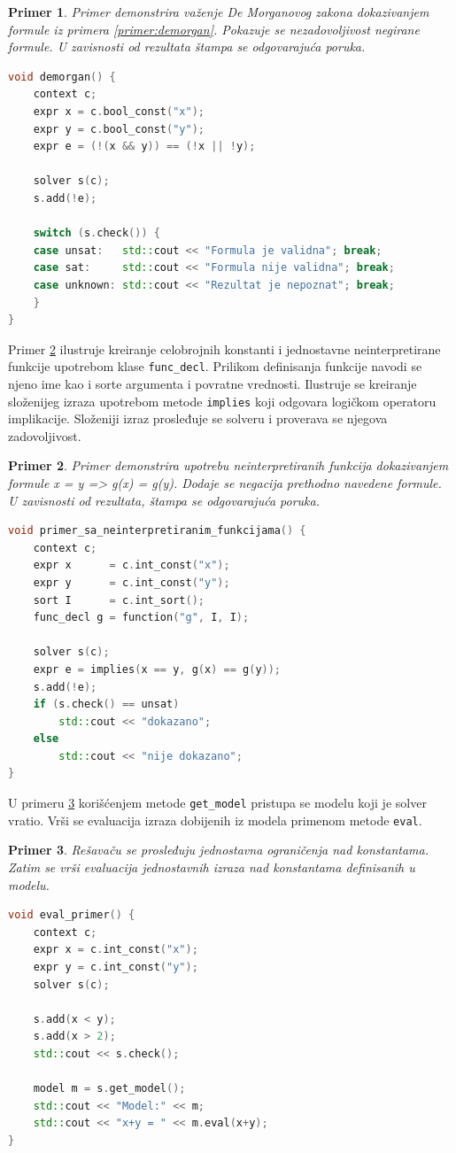 \documentclass[12pt,oneside]{memoir}
\newtheorem{primer}{Primer}
\begin{document}
\begin{primer} \label{ex1} Primer demonstrira važenje De Morganovog zakona dokazivanjem formule iz primera \ref{primer:demorgan}. Pokazuje se nezadovoljivost negirane formule. U zavisnosti od rezultata štampa se odgovarajuća poruka.
\begin{lstlisting}[language=C++]
void demorgan() {
    context c;
    expr x = c.bool_const("x");
    expr y = c.bool_const("y");
    expr e = (!(x && y)) == (!x || !y);
    
    solver s(c);
    s.add(!e);

    switch (s.check()) {
    case unsat:   std::cout << "Formula je validna"; break;
    case sat:     std::cout << "Formula nije validna"; break;
    case unknown: std::cout << "Rezultat je nepoznat"; break;
    }
}
\end{lstlisting}
\end{primer}

Primer \ref{ex2} ilustruje kreiranje celobrojnih konstanti i jednostavne neinterpretirane funkcije upotrebom klase \texttt{func\_decl}. Prilikom definisanja funkcije navodi se njeno ime kao i sorte argumenta i povratne vrednosti. Ilustruje se kreiranje složenijeg izraza upotrebom metode \texttt{implies} koji odgovara logičkom operatoru implikacije. Složeniji izraz prosleđuje se solveru i proverava se njegova zadovoljivost.
\begin{primer} \label{ex2} Primer demonstrira upotrebu neinterpretiranih funkcija dokazivanjem formule x = y => g(x) = g(y). Dodaje se negacija prethodno navedene formule. U zavisnosti od rezultata, štampa se odgovarajuća poruka.\\
\begin{lstlisting}[language=C++]
void primer_sa_neinterpretiranim_funkcijama() { 
    context c;
    expr x      = c.int_const("x");
    expr y      = c.int_const("y");
    sort I      = c.int_sort();
    func_decl g = function("g", I, I);
    
    solver s(c);
    expr e = implies(x == y, g(x) == g(y));
    s.add(!e);
    if (s.check() == unsat) 
        std::cout << "dokazano";
    else
        std::cout << "nije dokazano";
}
\end{lstlisting}
\end{primer}


U primeru \ref{ex3} korišćenjem metode \texttt{get\_model} pristupa se modelu koji je solver vratio. Vrši se evaluacija izraza dobijenih iz modela primenom metode \texttt{eval}.  
\begin{primer} \label{ex3} Rešavaču se prosleđuju jednostavna ograničenja nad konstantama. Zatim se vrši evaluacija jednostavnih izraza nad konstantama definisanih u modelu.
\begin{lstlisting}[language=C++]
void eval_primer() {
    context c;
    expr x = c.int_const("x");
    expr y = c.int_const("y");
    solver s(c);

    s.add(x < y);
    s.add(x > 2);
    std::cout << s.check();
    
    model m = s.get_model();
    std::cout << "Model:" << m;
    std::cout << "x+y = " << m.eval(x+y);
}
\end{lstlisting}
\end{primer}
\end{document}

